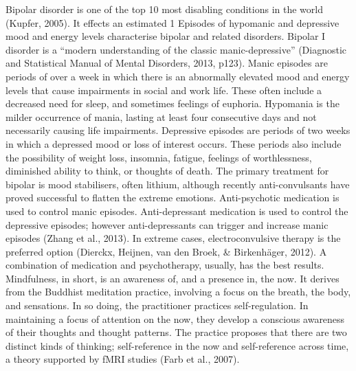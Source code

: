 {Bipolar disorder is one of the top 10 most disabling conditions in the world (Kupfer, 2005). It effects an estimated 1%
Episodes of hypomanic and depressive mood and energy levels characterise bipolar and related disorders. Bipolar I disorder is a “modern understanding of the classic manic-depressive” (Diagnostic and Statistical Manual of Mental Disorders, 2013, p123). Manic episodes are periods of over a week in which there is an abnormally elevated mood and energy levels that cause impairments in social and work life. These often include a decreased need for sleep, and sometimes feelings of euphoria. Hypomania is the milder occurrence of mania, lasting at least four consecutive days and not necessarily causing life impairments. Depressive episodes are periods of two weeks in which a depressed mood or loss of interest occurs. These periods also include the possibility of weight loss, insomnia, fatigue, feelings of worthlessness, diminished ability to think, or thoughts of death.
The primary treatment for bipolar is mood stabilisers, often lithium, although recently anti-convulsants have proved successful to flatten the extreme emotions. Anti-psychotic medication is used to control manic episodes. Anti-depressant medication is used to control the depressive episodes; however anti-depressants can trigger and increase manic episodes (Zhang et al., 2013). In extreme cases, electroconvulsive therapy is the preferred option (Dierckx, Heijnen, van den Broek, & Birkenhäger, 2012). A combination of medication and psychotherapy, usually, has the best results. 
Mindfulness, in short, is an awareness of, and a presence in, the now. It derives from the Buddhist meditation practice, involving a focus on the breath, the body, and sensations. In so doing, the practitioner practices self-regulation. In maintaining a focus of attention on the now, they develop a conscious awareness of their thoughts and thought patterns. The practice proposes that there are two distinct kinds of thinking; self-reference in the now and self-reference across time, a theory supported by fMRI studies (Farb et al., 2007). 

}
